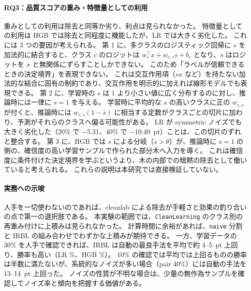 \documentclass[a4paper,10pt]{ltjsarticle}
\newcommand{\method}[1]{\texttt{#1}}
\newcommand{\cl}{\textsf{cleanlab}}
\begin{document}
\paragraph{RQ3：品質スコアの重み・特徴量としての利用}
重みとしての利用は除去と同等か劣り、利点は見られなかった。
特徴量としての利用は HGB では除去と同程度に機能したが、LR では大きく劣化した。
これには 3 つの要因が考えられる。
第 1 に、多クラスのロジスティック回帰に $s$ を加法的に結合すると、クラス $c$ のロジットは $w_c^\top x + w_{c,s} s + b_c$ となり、$s$ はロジットを $x$ と無関係にずらすことしかできない。
このため「ラベルが信頼できるときの決定境界」を表現できない。
これは交互作用項（$s x$ など）を持たない加法的な結合に固有の制約であり、交互作用を明示的に加えれば線形モデルでも表現できる。
第 2 に、学習時の $s$ は 1 より小さい値に広く分布するのに対し、推論時には一律に $s=1$ を与える。
学習時に平均的な $s$ の高いクラスに正の $w_{c,s}$ が付くと、推論時には $w_{c,s}(1 - \bar{s})$ に相当する定数がクラスごとの切片に加わり、予測がそれらのクラスへ偏る可能性がある。
LR が symmetric ノイズでも大きく劣化した（20\% で $-$5.31、40\% で $-$10.40~pt）ことは、この切片のずれと整合する。
第 3 に、HGB では $s$ による分岐（$s > \theta$）が、推論時に $s=1$ の側の、確信度の高い学習サンプルで作られた部分木へ入力を導く。
これは確信度に条件付けた決定境界を学ぶというより、木の内部での暗黙の除去として働いていると考えられる。
これらの説明は本研究では直接検証していない。

\paragraph{実務への示唆}
人手を一切使わないのであれば、\cl{} による除去が手軽さと効果の釣り合いの点で第一の選択肢である。
本実験の範囲では、\texttt{CleanLearning} のクラス別の再重み付けに上積みは見られなかった。
計算時間に余裕があれば、\method{naive} 分割と IRBL の組み合わせでわずかな上積みが期待できる。
一方、学習データの 30\% を人手で確認できれば、IRBL は自動の最良手法を平均で約 4--5~pt 上回り、勝率も高い（LR \PLROracleThirtyVsNaiveIrblWin\%、HGB \PHGBOracleThirtyVsNaiveIrblWin\%）。
10\% の確認では平均では上回るものの勝率は半数に満たないが、系統的なノイズが多い場合（pair 40\%）には自動の手法を 13--14~pt 上回った。
ノイズの性質が不明な場合は、少量の無作為サンプルを確認してノイズ率と傾向を把握する価値がある。
\end{document}
